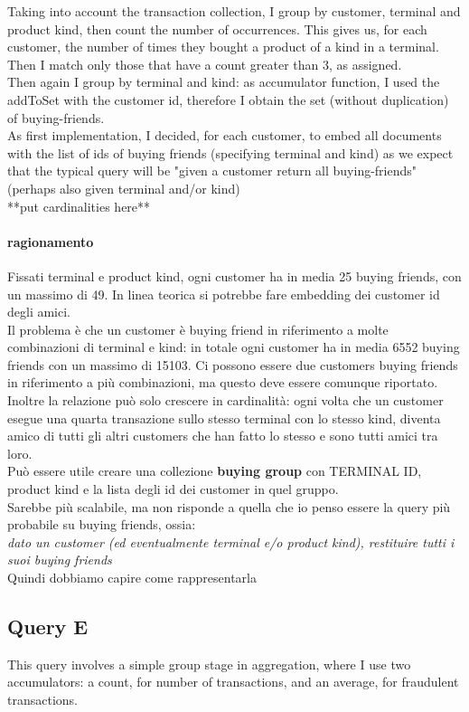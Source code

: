 \documentclass[runningheads]{llncs}
\begin{document}
Taking into account the transaction collection, I group by customer, terminal and product kind, then count the number of occurrences. This gives us, for each customer, the number of times they bought a product of a kind in a terminal. Then I match only those that have a count greater than 3, as assigned.\\
Then again I group by terminal and kind: as accumulator function, I used the addToSet with the customer id, therefore I obtain the set (without duplication) of buying-friends.\\
As first implementation, I decided, for each customer, to embed all documents with the list of ids of buying friends (specifying terminal and kind) as we expect that the typical query will be "given a customer return all buying-friends" (perhaps also given terminal and/or kind)\\
**put cardinalities here**\\
\paragraph{ragionamento}
Fissati terminal e product kind, ogni customer ha in media 25 buying friends, con un massimo di 49. In linea teorica si potrebbe fare embedding dei customer id degli amici.\\
Il problema è che un customer è buying friend in riferimento a molte combinazioni di terminal e kind: in totale ogni customer ha in media 6552 buying friends con un massimo di 15103. Ci possono essere due customers buying friends in riferimento a più combinazioni, ma questo deve essere comunque riportato.\\
Inoltre la relazione può solo crescere in cardinalità: ogni volta che un customer esegue una quarta transazione sullo stesso terminal con lo stesso kind, diventa amico di tutti gli altri customers che han fatto lo stesso e sono tutti amici tra loro.\\
Può essere utile creare una collezione \textbf{buying group} con TERMINAL ID, product kind e la lista degli id dei customer in quel gruppo.\\
Sarebbe più scalabile, ma non risponde a quella che io penso essere la query più probabile su buying friends, ossia:\\
\textit{dato un customer (ed eventualmente terminal e/o product kind), restituire tutti i suoi buying friends}\\
Quindi dobbiamo capire come rappresentarla

\subsection{Query E}
This query involves a simple group stage in aggregation, where I use two accumulators: a count, for number of transactions, and an average, for fraudulent transactions.
\end{document}
